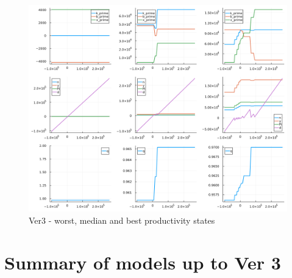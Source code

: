 \documentclass[12pt]{article}
\begin{document}
\begin{figure}[H]  %
    \centering
    \caption{Ver3 - worst, median and best productivity states} \label{chart:CFLcdf}
    \includegraphics[width=1\textwidth]{ver3.png}
\end{figure}


\newpage

\section{Summary of models up to Ver 3}
\end{document}
